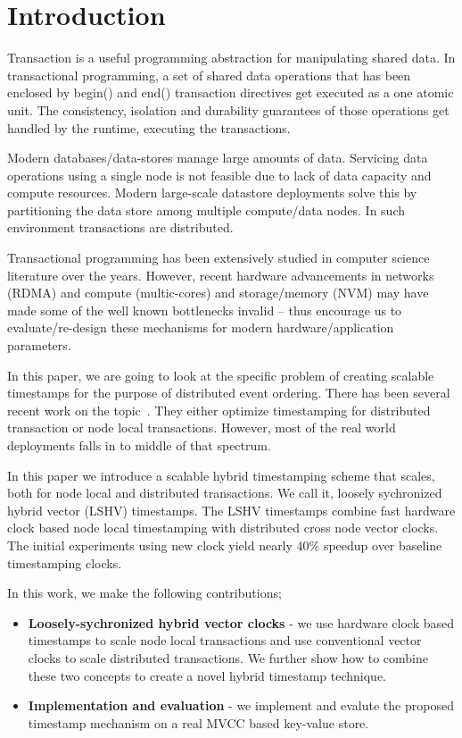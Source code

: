 \section{Introduction}
Transaction is a useful programming abstraction for manipulating 
shared data. In transactional programming,  a set of  shared data 
operations that has been enclosed by begin() and end() transaction 
directives get executed as a one atomic unit. The consistency, 
isolation and durability guarantees of those operations
get handled by the runtime, executing the transactions. 

Modern databases/data-stores manage large amounts of data. 
Servicing data operations using a single node is not feasible 
due to lack of data capacity and compute resources. Modern large-scale 
datastore deployments solve this by partitioning the 
data store among multiple compute/data nodes. In such environment
transactions are distributed.

Transactional programming has been extensively studied in 
computer science literature over the years. However, recent
hardware advancements in networks (RDMA) and compute (multic-cores) and
storage/memory (NVM) may have made some of the well known bottlenecks
invalid -- thus encourage us to evaluate/re-design these mechanisms for
modern hardware/application parameters.

In this paper, we are going to look at the specific problem of creating
scalable timestamps for the purpose of distributed event ordering.
There has been several recent work on the topic~\cite{namdb, cicada}. They
either optimize timestamping for distributed transaction or node local 
transactions. However, most of the real world deployments falls in to
middle of that spectrum.

In this paper we introduce a scalable hybrid timestamping scheme 
that scales, both for node local and distributed transactions. 
We call it, loosely sychronized hybrid vector (LSHV) timestamps.
The LSHV timestamps combine fast hardware clock based 
node local timestamping with distributed cross node vector clocks.
The initial experiments using new clock yield nearly 40\% speedup
over baseline timestamping clocks.

In this work, we make the following contributions;
\begin{itemize}
	\item{\bf Loosely-sychronized hybrid vector clocks} - we use hardware clock based timestamps to 
		scale node local transactions and use conventional vector clocks to scale distributed
		transactions. We further show how to combine these two concepts to create a novel hybrid 
		timestamp technique.
	\item{\bf Implementation and evaluation} - we implement and evalute the proposed 
		timestamp mechanism on a real MVCC based key-value store.
\end{itemize}

